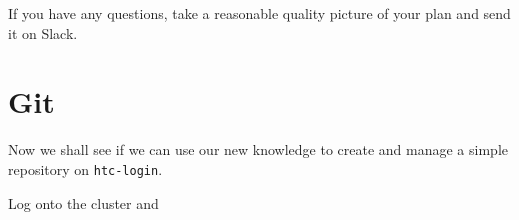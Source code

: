\documentclass[a4paper, 12pt]{article}
\def \cc   {\tt }               %
\begin{document}
If you have any questions, take a reasonable quality picture of your plan and send it on Slack.


\section{Git}
\label{On Arcus-HTC}

Now we shall see if we can use our new knowledge to create and manage a simple repository on {\cc htc-login}.

Log onto the cluster and
\end{document}
